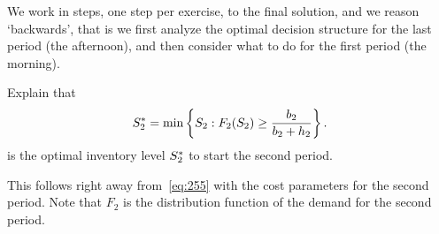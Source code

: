 We work in steps, one step per exercise, to the final solution, and we reason `backwards', that is we first analyze the optimal decision structure for the last period (the afternoon), and then consider what to do for the first period (the morning).





\begin{exercise} Explain that 
\begin{align*}
S^*_2 = \min\left\{S_2 : F_2(S_2)\geq \frac{b_2}{b_2+h_2}\right\}.
\end{align*}
is the optimal inventory level $S_2^*$ to  start the second period.
\begin{solution}
This follows right away from~\eqref{eq:255} with the cost parameters for the second period. Note that  $F_2$ is the distribution function of the demand for the second period.
\end{solution}
\end{exercise}


